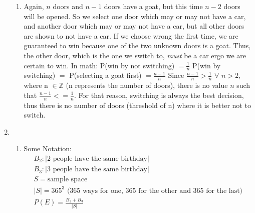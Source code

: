 \documentclass[11pt]{article}
\begin{document}
\begin{flushleft}
\begin{enumerate}
{\begin{enumerate}
				      				\item {
				      					      Again, $n$ doors and $n-1$ doors have a goat, but this time $n-2$ doors will be opened. So we select one door which may or may not have a car, and another door which may or may not have a car, but all other doors are shown to not have a car. If we choose wrong the first time, we are guaranteed to win because one of the two unknown doors is a goat. Thus, the other door, which is the one we switch to, \emph{must} be a car ergo we are certain to win. In math:\linebreak\linebreak
				      					      P(win by not switching) $= \frac{1}{n}$\linebreak
				      					      P(win by switching) $=$ P(selecting a goat first) $= \frac{n-1}{n}$\linebreak
				      					      \linebreak
				      					      Since $\frac{n-1}{n} > \frac{1}{n}$ $\forall$ $n > 2$, where n $\in \mathbb{Z}$ (n represents the number of doors), there is no value $n$ such that $\frac{n-1}{n} <= \frac{1}{n}$. For that reason, switching is always the best decision, thus there is no number of doors (threshold of n) where it is better not to switch. 
				      					}
				      				\end{enumerate}
				      			}
				      			
				      			\item {
				      				      \begin{enumerate}
				      				      	\item { %
				      				      		      Some Notation:
				      				      		      \begin{align}
				      				      		      	B_2: |\text{{2 people have the same birthday}}| \nonumber                                \\
				      				      		      	B_3: |\text{{3 people have the same birthday}}| \nonumber                                \\
				      				      		      	S = \text{sample space} \nonumber                                                        \\
				      				      		      	|S| = 365^3 \text{ (365 ways for one, 365 for the other and 365 for the last)} \nonumber \\
				      				      		      	P(E) = \frac{B_2 + B_3}{|S|} \nonumber                                                   
				      				      		      \end{align}
				      				      		      
}
\end{enumerate}}
\end{enumerate}
\end{flushleft}
\end{document}
